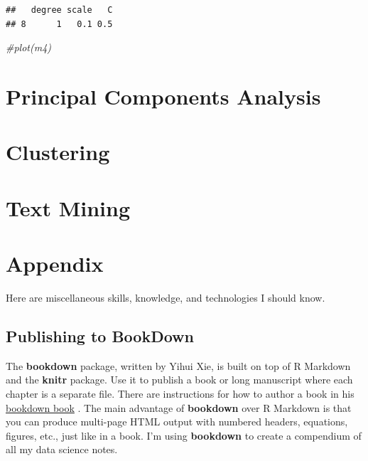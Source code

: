 \documentclass[
]{book}
\newenvironment{Shaded}{\begin{snugshade}}{\end{snugshade}}
\newcommand{\CommentTok}[1]{\textcolor[rgb]{0.56,0.35,0.01}{\textit{#1}}}
\begin{document}
\begin{verbatim}
##   degree scale   C
## 8      1   0.1 0.5
\end{verbatim}

\begin{Shaded}
\begin{Highlighting}[]
\CommentTok{#plot(m4)}
\end{Highlighting}
\end{Shaded}

\hypertarget{principal-components-analysis}{%
\chapter{Principal Components Analysis}\label{principal-components-analysis}}

\hypertarget{clustering}{%
\chapter{Clustering}\label{clustering}}

\hypertarget{text-mining}{%
\chapter{Text Mining}\label{text-mining}}

\hypertarget{appendix}{%
\chapter*{Appendix}\label{appendix}}

Here are miscellaneous skills, knowledge, and technologies I should know.

\hypertarget{publishing-to-bookdown}{%
\section*{Publishing to BookDown}\label{publishing-to-bookdown}}

The \textbf{bookdown} package, written by Yihui Xie, is built on top of R Markdown and the \textbf{knitr} package. Use it to publish a book or long manuscript where each chapter is a separate file. There are instructions for how to author a book in his \href{https://bookdown.org/yihui/bookdown/}{bookdown book} \citep{xie2019}. The main advantage of \textbf{bookdown} over R Markdown is that you can produce multi-page HTML output with numbered headers, equations, figures, etc., just like in a book. I'm using \textbf{bookdown} to create a compendium of all my data science notes.
\end{document}
